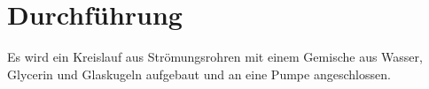 \section{Durchführung}
\label{sec:Durchführung}

Es wird ein Kreislauf aus Strömungsrohren mit einem Gemische aus Wasser, Glycerin und Glaskugeln aufgebaut
und an eine Pumpe angeschlossen.